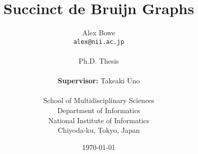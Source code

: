 \documentclass[11pt,a4paper]{report}
\begin{document}
\title{Succinct de Bruijn Graphs}
\author{Alex Bowe\\
\texttt{alex@nii.ac.jp} \\ \\
Ph.D. Thesis\\ \\
\textbf{Supervisor:} Takeaki Uno\\ \\
School of Multidisciplinary Sciences \\
Department of Informatics \\
National Institute of Informatics \\
Chiyoda-ku, Tokyo, Japan}

\date{\today}



%

\setcounter{tocdepth}{1}




%
%
%
%
%
%
%
%
%
%

%




\end{document}
